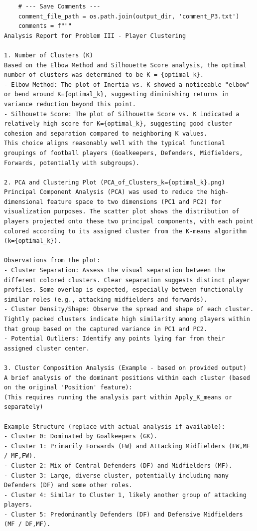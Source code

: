 \documentclass[12pt]{report}
\begin{document}
{{{\begin{lstlisting}
    # --- Save Comments ---
    comment_file_path = os.path.join(output_dir, 'comment_P3.txt')
    comments = f"""
Analysis Report for Problem III - Player Clustering

1. Number of Clusters (K)
Based on the Elbow Method and Silhouette Score analysis, the optimal number of clusters was determined to be K = {optimal_k}.
- Elbow Method: The plot of Inertia vs. K showed a noticeable "elbow" or bend around K={optimal_k}, suggesting diminishing returns in variance reduction beyond this point.
- Silhouette Score: The plot of Silhouette Score vs. K indicated a relatively high score for K={optimal_k}, suggesting good cluster cohesion and separation compared to neighboring K values.
This choice aligns reasonably well with the typical functional groupings of football players (Goalkeepers, Defenders, Midfielders, Forwards, potentially with subgroups).

2. PCA and Clustering Plot (PCA_of_Clusters_k={optimal_k}.png)
Principal Component Analysis (PCA) was used to reduce the high-dimensional feature space to two dimensions (PC1 and PC2) for visualization purposes. The scatter plot shows the distribution of players projected onto these two principal components, with each point colored according to its assigned cluster from the K-means algorithm (k={optimal_k}).

Observations from the plot:
- Cluster Separation: Assess the visual separation between the different colored clusters. Clear separation suggests distinct player profiles. Some overlap is expected, especially between functionally similar roles (e.g., attacking midfielders and forwards).
- Cluster Density/Shape: Observe the spread and shape of each cluster. Tightly packed clusters indicate high similarity among players within that group based on the captured variance in PC1 and PC2.
- Potential Outliers: Identify any points lying far from their assigned cluster center.

3. Cluster Composition Analysis (Example - based on provided output)
A brief analysis of the dominant positions within each cluster (based on the original 'Position' feature):
(This requires running the analysis part within Apply_K_means or separately)

Example Structure (replace with actual analysis if available):
- Cluster 0: Dominated by Goalkeepers (GK).
- Cluster 1: Primarily Forwards (FW) and Attacking Midfielders (FW,MF / MF,FW).
- Cluster 2: Mix of Central Defenders (DF) and Midfielders (MF).
- Cluster 3: Large, diverse cluster, potentially including many Defenders (DF) and some other roles.
- Cluster 4: Similar to Cluster 1, likely another group of attacking players.
- Cluster 5: Predominantly Defenders (DF) and Defensive Midfielders (MF / DF,MF).


\end{lstlisting}}}}
\end{document}
